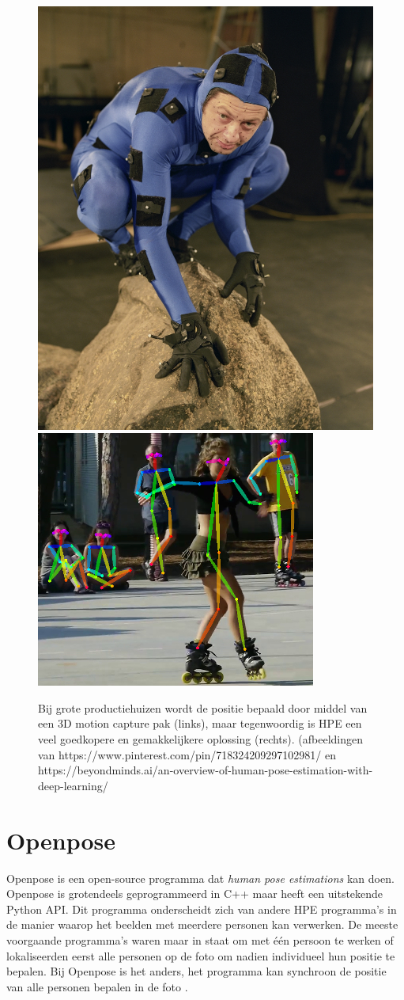 \documentclass[a4paper,twoside,kulak]{kulakreport}
\begin{document}
	\begin{figure}[H]
		\includegraphics[width=.4\textwidth]{3D_motion_capture}
		\includegraphics[width=.55\textwidth]{HPE_voorbeeld}
		\caption{Bij grote productiehuizen wordt de positie bepaald door middel van een 3D motion capture pak (links), maar tegenwoordig is HPE een veel goedkopere en gemakkelijkere oplossing (rechts).
		(afbeeldingen van https://www.pinterest.com/pin/718324209297102981/ en https://beyondminds.ai/an-overview-of-human-pose-estimation-with-deep-learning/}
	\end{figure}

\section{Openpose}
Openpose is een open-source programma dat \emph{human pose estimations} kan doen. Openpose is grotendeels geprogrammeerd in C++ maar heeft een uitstekende Python API. Dit programma onderscheidt zich van andere HPE programma's in de manier waarop het beelden met meerdere personen kan verwerken. De meeste voorgaande programma's waren maar in staat om met één persoon te werken of lokaliseerden eerst alle personen op de foto om nadien individueel hun positie te bepalen. Bij Openpose is het anders, het programma kan synchroon de positie van alle personen bepalen in de foto \cite{openpose}.
\end{document}
